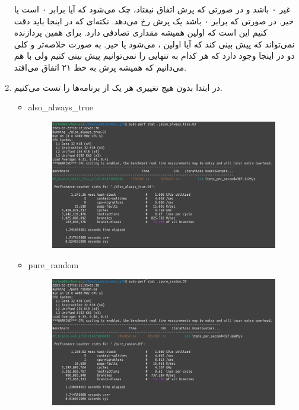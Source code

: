 \begin{enumerate}
    غیر ۰ باشد و در صورتی که پرش اتفاق نیفتاد، چک می‌شود که آیا
    برابر ۰ است یا خیر. در صورتی که برابر ۰ باشد یک پرش رخ می‌دهد. نکته‌ای که در اینجا باید دقت کنیم
    این است که اولین
    همیشه مقداری تصادفی دارد. برای همین پردازنده نمی‌تواند که پیش بینی کند که آیا اولین
    ،  می‌شود یا خیر.
    به صورت خلاصه‌تر و کلی دو 
    در اینجا وجود دارد که هر کدام به تنهایی را نمی‌توانیم پیش بینی کنیم ولی با هم می‌دانیم که همیشه
    پرش به خط ۲۱ اتفاق می‌افتد.
    \item در ابتدا بدون هیچ تغییری هر یک از برنامه‌ها را تست می‌کنیم.
    \begin{latin}
    \begin{itemize}
        \item also\_always\_true
        \begin{figure}[H]
            \centerline{\includegraphics[scale=0.35]{pics/5/D/also_always_true.png}}
        \end{figure}
        \item pure\_random
        \begin{figure}[H]
            \centerline{\includegraphics[scale=0.35]{pics/5/D/pure_random.png}}

\end{figure}
\end{itemize}
\end{latin}
\end{enumerate}
